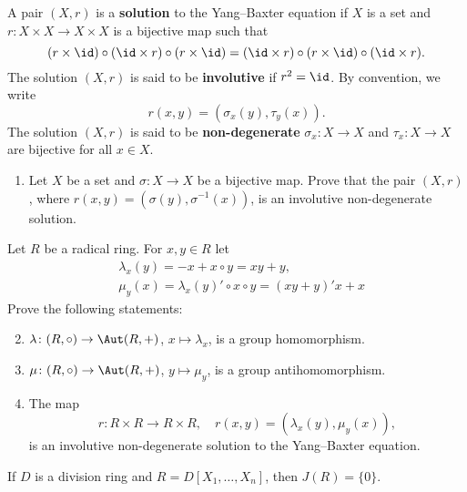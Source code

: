 \begin{exercise}
A pair $(X,r)$ is a \textbf{solution} to the 
Yang--Baxter equation if $X$ is a set and
$r\colon X\times X\to X\times X$ is a bijective map such that  
\[
	(r\times\id)\circ (\id\times r)\circ (r\times\id)
	=(\id\times r)\circ (r\times\id)\circ (\id\times r).
\]
The solution $(X,r)$ is said to be \textbf{involutive} 
if $r^2=\id$. By convention, we write 
\[
	r(x,y)=(\sigma_x(y),\tau_y(x)).
\]
The solution $(X,r)$ is said to be \textbf{non-degenerate}  
$\sigma_x\colon X\to X$ and 
$\tau_x\colon X\to X$ are bijective for all $x\in X$.

\begin{enumerate}
    \item Let $X$ be a set and $\sigma\colon X\to X$ be a bijective map. Prove that  
          the pair $(X,r)$, where 
          $r(x,y)=(\sigma(y),\sigma^{-1}(x))$, is an involutive non-degenerate solution. 
\end{enumerate}
Let $R$ be a radical ring. For $x,y\in R$ let 
\begin{align*}
	&\lambda_x(y)=-x+x\circ y=xy+y,\\
	&\mu_y(x)=\lambda_x(y)'\circ x\circ y=(xy+y)'x+x
\end{align*}
Prove the following statements:
\begin{enumerate}
    \setcounter{enumi}{1}
		\item $\lambda\colon (R,\circ)\to\Aut(R,+)$, $x\mapsto
			\lambda_x$, is a group homomorphism.
		\item $\mu\colon (R,\circ)\to\Aut(R,+)$, $y\mapsto\mu_y$,
    		is a group antihomomorphism.
	    \item The map 
    	\[
	        r\colon R\times R\to R\times R,\quad
	        r(x,y)=(\lambda_x(y),\mu_y(x)),
	    \]
	is an involutive non-degenerate solution to the Yang--Baxter equation. 
\end{enumerate}
\end{exercise}


\begin{exercise}
    If $D$ is a division ring and $R=D[X_1,\dots,X_n]$, then
    $J(R)=\{0\}$. 
\end{exercise}


